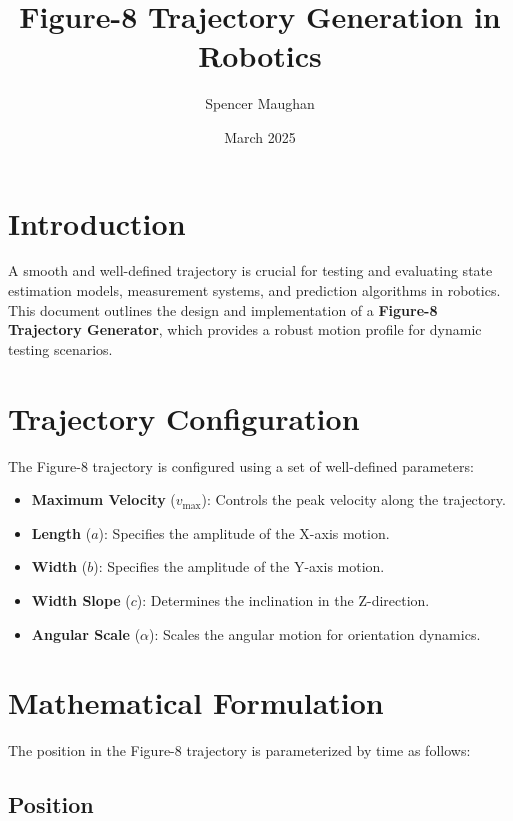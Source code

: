\documentclass{article}
\title{Figure-8 Trajectory Generation in Robotics}
\author{Spencer Maughan}
\date{March 2025}
\begin{document}
	\maketitle

	\section{Introduction}
	A smooth and well-defined trajectory is crucial for testing and evaluating state estimation models, measurement systems, and prediction algorithms in robotics. This document outlines the design and implementation of a \textbf{Figure-8 Trajectory Generator}, which provides a robust motion profile for dynamic testing scenarios.

	\section{Trajectory Configuration}
	The Figure-8 trajectory is configured using a set of well-defined parameters:

	\begin{itemize}
		\item \textbf{Maximum Velocity} ($v_{\text{max}}$): Controls the peak velocity along the trajectory.
		\item \textbf{Length} ($a$): Specifies the amplitude of the X-axis motion.
		\item \textbf{Width} ($b$): Specifies the amplitude of the Y-axis motion.
		\item \textbf{Width Slope} ($c$): Determines the inclination in the Z-direction.
		\item \textbf{Angular Scale} ($\alpha$): Scales the angular motion for orientation dynamics.
	\end{itemize}

	\section{Mathematical Formulation}
	The position in the Figure-8 trajectory is parameterized by time as follows:

\subsection*{Position}
\end{document}
